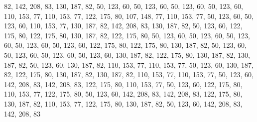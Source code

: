 82, 142, 208, 83, 130, 187, 82, 50, 123, 60, 50, 123, 60, 50, 123, 60,
50, 123, 60, 110, 153, 77, 110, 153, 77, 122, 175, 80, 107, 148, 77, 110,
153, 77, 50, 123, 60, 50, 123, 60, 110, 153, 77, 130, 187, 82, 142, 208,
83, 130, 187, 82, 50, 123, 60, 122, 175, 80, 122, 175, 80, 130, 187, 82,
122, 175, 80, 50, 123, 60, 50, 123, 60, 50, 123, 60, 50, 123, 60, 50,
123, 60, 122, 175, 80, 122, 175, 80, 130, 187, 82, 50, 123, 60, 50, 123,
60, 50, 123, 60, 50, 123, 60, 130, 187, 82, 122, 175, 80, 130, 187, 82,
130, 187, 82, 50, 123, 60, 130, 187, 82, 110, 153, 77, 110, 153, 77, 50,
123, 60, 130, 187, 82, 122, 175, 80, 130, 187, 82, 130, 187, 82, 110, 153,
77, 110, 153, 77, 50, 123, 60, 142, 208, 83, 142, 208, 83, 122, 175, 80,
110, 153, 77, 50, 123, 60, 122, 175, 80, 110, 153, 77, 122, 175, 80, 50,
123, 60, 142, 208, 83, 142, 208, 83, 122, 175, 80, 130, 187, 82, 110, 153,
77, 122, 175, 80, 130, 187, 82, 50, 123, 60, 142, 208, 83, 142, 208, 83
